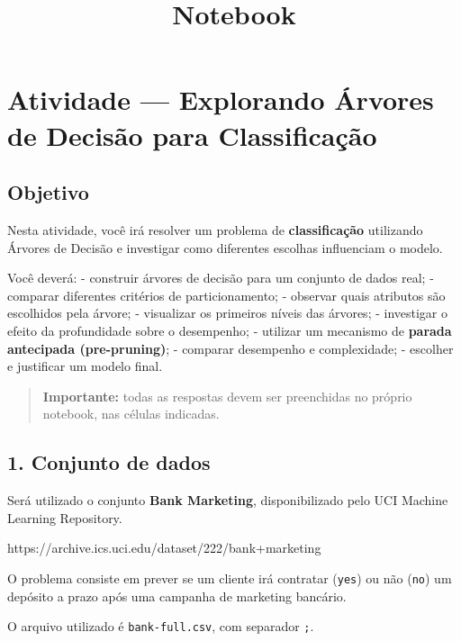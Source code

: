 \documentclass[11pt]{article}
\title{Notebook}
\begin{document}
    
    \maketitle
    
    

    
    \section{Atividade --- Explorando Árvores de Decisão para
Classificação}\label{atividade-explorando-uxe1rvores-de-decisuxe3o-para-classificauxe7uxe3o}

\subsection{Objetivo}\label{objetivo}

Nesta atividade, você irá resolver um problema de \textbf{classificação}
utilizando Árvores de Decisão e investigar como diferentes escolhas
influenciam o modelo.

Você deverá: - construir árvores de decisão para um conjunto de dados
real; - comparar diferentes critérios de particionamento; - observar
quais atributos são escolhidos pela árvore; - visualizar os primeiros
níveis das árvores; - investigar o efeito da profundidade sobre o
desempenho; - utilizar um mecanismo de \textbf{parada antecipada
(pre-pruning)}; - comparar desempenho e complexidade; - escolher e
justificar um modelo final.

\begin{quote}
\textbf{Importante:} todas as respostas devem ser preenchidas no próprio
notebook, nas células indicadas.
\end{quote}

    \subsection{1. Conjunto de dados}\label{conjunto-de-dados}

Será utilizado o conjunto \textbf{Bank Marketing}, disponibilizado pelo
UCI Machine Learning Repository.

https://archive.ics.uci.edu/dataset/222/bank+marketing

O problema consiste em prever se um cliente irá contratar (\texttt{yes})
ou não (\texttt{no}) um depósito a prazo após uma campanha de marketing
bancário.

O arquivo utilizado é \texttt{bank-full.csv}, com separador \texttt{;}.
\end{document}
